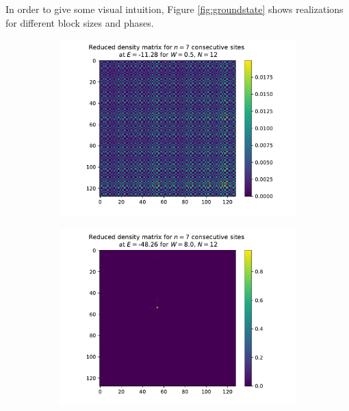 \documentclass[reprint,amsmath,amssymb,aps,prb]{revtex4-2}
\begin{document}
In order to give some visual intuition, Figure \ref{fig:groundstate} shows realizations for different block sizes and phases.
\newpage\onecolumngrid
\begin{center}
	\begin{figure}[H]
		\centering	
		\begin{subfigure}[c]{0.45\textwidth}
			\includegraphics[width=\textwidth]{../results/groundstates/N12n7_trainingset_groundstate_Wmax0.5.pdf}
		\end{subfigure}
		\begin{subfigure}[c]{0.45\textwidth}
			\includegraphics[width=\textwidth]{../results/groundstates/N12n7_trainingset_groundstate_Wmax8.0.pdf}

\end{subfigure}
\end{figure}
\end{center}
\end{document}

